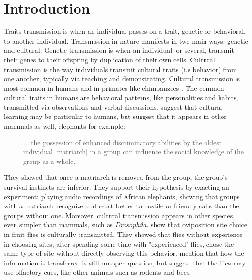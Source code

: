 \documentclass[11pt]{article}
\begin{document}
\section{Introduction}
Traits transmission is when an individual passes on a trait, genetic or behavioral, to another individual. Transmission in nature manifests in two main ways: genetic and cultural.
Genetic transmission is when an individual, or several, transmit their genes to their offspring by duplication of their own cells.
Cultural transmission is the way individuals transmit cultural traits (i.e behavior) from one another, typically via teaching and demonstrating.
 Cultural transmission is most common in humans \citep[pg. 3]{transmissionVectorsBook} and in primates like chimpanzees \citep{chimpsPrestige, chimpsCopy}.
 The common cultural traits in humans are behavioral patterns, like personalities and habits, transmitted via observations and verbal discussions.
\citet{dualEvolution} suggest that cultural learning may be particular to humans, but \citet{elepahntsRepo} suggest that it appears in other mammals as well, elephants for example:
 \begin{quote}
	   ... the possession of enhanced discriminatory abilities by the oldest individual [matriarch] in a group can influence the social knowledge of the group as a whole.
 \end{quote}
 They showed that once a matriarch is removed from the group, the group's survival instincts are inferior.
 They support their hypothesis by exacting an experiment: playing audio recordings of African elephants, showing that groups with a matriarch recognize and react better to hostile or friendly calls than the groups without one.
Moreover, cultural transmission appears in other species, even simpler than mammals, such as \textit{Drosophila}.
\citet{fliesPaper} show that oviposition site choice in fruit flies is culturally transmitted.
They showed that flies without experience in choosing sites, after spending some time with "experienced" flies, chose the same type of site without directly observing this behavior. 
\citet{fliesPaper} mention that how the information is transferred is still an open question, but suggest that the flies may use olfactory cues, like other animals such as rodents and bees.\\ 
\end{document}
